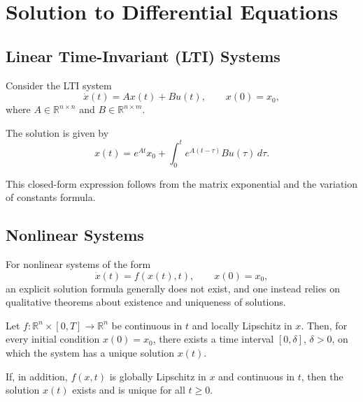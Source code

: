 \section{Solution to Differential Equations}

\subsection{Linear Time-Invariant (LTI) Systems}

Consider the LTI system
\begin{equation}
    \dot{x}(t) = A x(t) + B u(t), \qquad x(0) = x_0,
\end{equation}
where $A \in \mathbb{R}^{n \times n}$ and $B \in \mathbb{R}^{n \times m}$.

The solution is given by
\begin{equation}
    x(t) = e^{At} x_0 + \int_0^t e^{A(t-\tau)} B u(\tau)\, d\tau.
\end{equation}

This closed-form expression follows from the matrix exponential and the variation of constants formula.


\subsection{Nonlinear Systems}

For nonlinear systems of the form
\begin{equation}
    \dot{x}(t) = f(x(t),t), \qquad x(0) = x_0,
\end{equation}
an explicit solution formula generally does not exist, and one instead relies on qualitative theorems about existence and uniqueness of solutions.


\begin{theorem}
    Let $f:\mathbb{R}^n \times [0,T] \to \mathbb{R}^n$ be continuous in $t$ and locally Lipschitz in $x$.  
    Then, for every initial condition $x(0)=x_0$, there exists a time interval $[0,\delta]$, $\delta > 0$, on which the system has a unique solution $x(t)$.
\end{theorem}


\begin{theorem}
    If, in addition, $f(x,t)$ is globally Lipschitz in $x$ and continuous in $t$, then the solution $x(t)$ exists and is unique for all $t \geq 0$.
\end{theorem}
